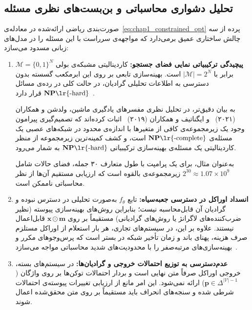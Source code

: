 \subsection{تحلیل دشواری محاسباتی و بن‌بست‌های نظری مسئله}\label{sec:1-1-2}

صورت‌بندی ریاضی ارائه‌شده در معادله‌ی~\ref{eq:chap1_constrained_opt} پرده از سه چالش ساختاری عمیق برمی‌دارد که مواجهه‌ی سرراست با این مسئله را در مدل‌های زبانی مسدود می‌سازد:
\begin{enumerate}
    \item \textbf{پیچیدگی ترکیبیاتی نمایی فضای جستجو:} کاردینالیتی مشبکه‌ی بولی $\mathcal{M} = {\{0, 1\}}^N$ برابر با $|\mathcal{M}| = 2^N$ است. بهینه‌سازی تابعی بر روی این ابرمکعب گسسته بدون دسترسی به اطلاعات تحلیلی گرادیان، در حالت کلی در رده‌ی مسائل $\mathbf{NP}\text{\lr{-hard}}$ قرار دارد~\cite{waldchen2021computational, ignatiev2019abduction}. 
    
    به بیان دقیق‌تر، در تحلیل نظری مفسرهای یادگیری ماشین، ولدشن و همکاران (۲۰۲۱)~\cite{waldchen2021computational} و ایگناتیف و همکاران (۲۰۱۹)~\cite{ignatiev2019abduction} اثبات کرده‌اند که تصمیم‌گیری پیرامون وجود یک زیرمجموعه‌ی کافی از متغیرها با اندازه‌ی محدود در شبکه‌های عصبی یک مسئله‌ی $\mathbf{NP}\text{\lr{-complete}}$ است، و کشف کمینه‌ترین زیرمجموعه از منظر کاردینالیتی یک مسئله‌ی بهینه‌سازی ترکیبیاتی $\mathbf{NP}\text{\lr{-hard}}$ به شمار می‌رود.
    
    به‌عنوان مثال، برای یک پرامپت با طول متعارف ۳۰ جمله، فضای حالات شامل $2^{30} \approx 1.07 \times 10^9$ زیرمجموعه‌ی بالقوه است که ارزیابی مستقیم آن‌ها از نظر محاسباتی ناممکن است.
    
    \item \textbf{انسداد اوراکل در دسترسی جعبه‌سیاه:} تابع $f_\theta$ به‌صورت تحلیلی در دسترس نبوده و گرادیان آن قابل‌محاسبه نیست؛ بنابراین روش‌های بهینه‌سازی پیوسته (نظیر ضرب‌کننده‌های لاگرانژ یا روش‌های گرادیانی) مستقیماً بر روی $\mathbf{x} \odot \mathbf{m}$ قابل‌اعمال نیستند. علاوه بر این، در سیستم‌های تجاری، هر بار استعلام از اوراکل مستلزم صرف هزینه، پهنای باند و زمان تأخیر شبکه در بستر  است که پرس‌وجوهای مکرر و بهینه‌سازی‌های مرتبه‌صفر را با محدودیت‌های شدید محاسباتی مواجه می‌سازد~\cite{nesterov2017random}.
    
    \item \textbf{عدم‌دسترسی به توزیع احتمالات خروجی و گرادیان‌ها:} در سیستم‌های بسته، خروجی اوراکل صرفاً متن نهایی است و بردار احتمالات توکن‌ها بر روی واژگان ($\mathbf{p} \in \Delta^{|\mathcal{V}|-1}$) ارائه نمی‌شود. این امر مانع از ارزیابی تغییرات پیوسته‌ی احتمالات شرطی شده و سنجه‌های انحراف باید مستقیماً بر روی متن محقق‌شده اعمال شوند.
\end{enumerate}

